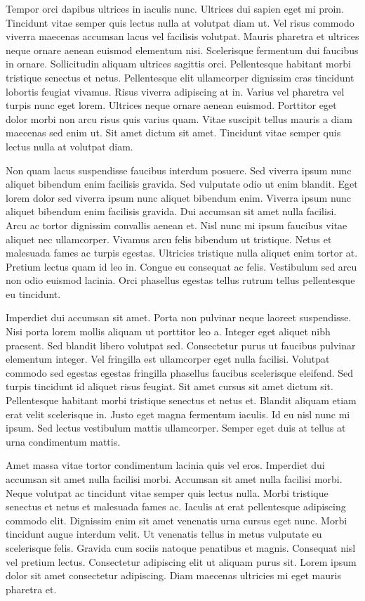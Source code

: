\documentclass[11pt,a4paper]{article}
\begin{document}
Tempor orci dapibus ultrices in iaculis nunc. Ultrices dui sapien eget mi proin. Tincidunt vitae semper quis lectus nulla at volutpat diam ut. Vel risus commodo viverra maecenas accumsan lacus vel facilisis volutpat. Mauris pharetra et ultrices neque ornare aenean euismod elementum nisi. Scelerisque fermentum dui faucibus in ornare. Sollicitudin aliquam ultrices sagittis orci. Pellentesque habitant morbi tristique senectus et netus. Pellentesque elit ullamcorper dignissim cras tincidunt lobortis feugiat vivamus. Risus viverra adipiscing at in. Varius vel pharetra vel turpis nunc eget lorem. Ultrices neque ornare aenean euismod. Porttitor eget dolor morbi non arcu risus quis varius quam. Vitae suscipit tellus mauris a diam maecenas sed enim ut. Sit amet dictum sit amet. Tincidunt vitae semper quis lectus nulla at volutpat diam.

Non quam lacus suspendisse faucibus interdum posuere. Sed viverra ipsum nunc aliquet bibendum enim facilisis gravida. Sed vulputate odio ut enim blandit. Eget lorem dolor sed viverra ipsum nunc aliquet bibendum enim. Viverra ipsum nunc aliquet bibendum enim facilisis gravida. Dui accumsan sit amet nulla facilisi. Arcu ac tortor dignissim convallis aenean et. Nisl nunc mi ipsum faucibus vitae aliquet nec ullamcorper. Vivamus arcu felis bibendum ut tristique. Netus et malesuada fames ac turpis egestas. Ultricies tristique nulla aliquet enim tortor at. Pretium lectus quam id leo in. Congue eu consequat ac felis. Vestibulum sed arcu non odio euismod lacinia. Orci phasellus egestas tellus rutrum tellus pellentesque eu tincidunt.

Imperdiet dui accumsan sit amet. Porta non pulvinar neque laoreet suspendisse. Nisi porta lorem mollis aliquam ut porttitor leo a. Integer eget aliquet nibh praesent. Sed blandit libero volutpat sed. Consectetur purus ut faucibus pulvinar elementum integer. Vel fringilla est ullamcorper eget nulla facilisi. Volutpat commodo sed egestas egestas fringilla phasellus faucibus scelerisque eleifend. Sed turpis tincidunt id aliquet risus feugiat. Sit amet cursus sit amet dictum sit. Pellentesque habitant morbi tristique senectus et netus et. Blandit aliquam etiam erat velit scelerisque in. Justo eget magna fermentum iaculis. Id eu nisl nunc mi ipsum. Sed lectus vestibulum mattis ullamcorper. Semper eget duis at tellus at urna condimentum mattis.

Amet massa vitae tortor condimentum lacinia quis vel eros. Imperdiet dui accumsan sit amet nulla facilisi morbi. Accumsan sit amet nulla facilisi morbi. Neque volutpat ac tincidunt vitae semper quis lectus nulla. Morbi tristique senectus et netus et malesuada fames ac. Iaculis at erat pellentesque adipiscing commodo elit. Dignissim enim sit amet venenatis urna cursus eget nunc. Morbi tincidunt augue interdum velit. Ut venenatis tellus in metus vulputate eu scelerisque felis. Gravida cum sociis natoque penatibus et magnis. Consequat nisl vel pretium lectus. Consectetur adipiscing elit ut aliquam purus sit. Lorem ipsum dolor sit amet consectetur adipiscing. Diam maecenas ultricies mi eget mauris pharetra et.
\end{document}
